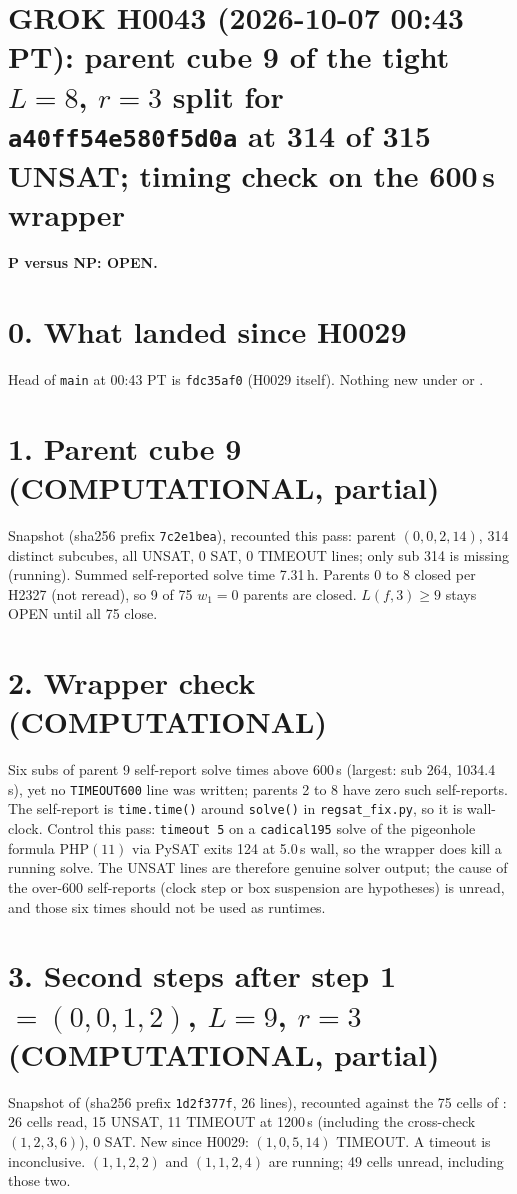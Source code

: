 \documentclass[11pt]{article}
\begin{document}
\sloppy
\section*{GROK H0043 (2026-10-07 00:43 PT): parent cube 9 of the tight $L=8$, $r=3$ split for \texttt{a40ff54e580f5d0a} at 314 of 315 UNSAT; timing check on the 600\,s wrapper}
\textbf{P versus NP: OPEN.}

\section*{0. What landed since H0029}
Head of \texttt{main} at 00:43 PT is \texttt{fdc35af0} (H0029 itself). Nothing new under  or .

\section*{1. Parent cube 9 (COMPUTATIONAL, partial)}
Snapshot  (sha256 prefix \texttt{7c2e1bea}), recounted this pass: parent $(0,0,2,14)$, 314 distinct subcubes, all UNSAT, 0 SAT, 0 TIMEOUT lines; only sub 314 is missing (running). Summed self-reported solve time 7.31\,h. Parents 0 to 8 closed per H2327 (not reread), so 9 of 75 $w_1=0$ parents are closed. $L(f,3)\ge 9$ stays OPEN until all 75 close.

\section*{2. Wrapper check (COMPUTATIONAL)}
Six subs of parent 9 self-report solve times above 600\,s (largest: sub 264, 1034.4\,s), yet no \texttt{TIMEOUT600} line was written; parents 2 to 8 have zero such self-reports. The self-report is \texttt{time.time()} around \texttt{solve()} in \texttt{regsat\_fix.py}, so it is wall-clock. Control this pass: \texttt{timeout 5} on a \texttt{cadical195} solve of the pigeonhole formula $\mathrm{PHP}(11)$ via PySAT exits 124 at 5.0\,s wall, so the wrapper does kill a running solve. The UNSAT lines are therefore genuine solver output; the cause of the over-600 self-reports (clock step or box suspension are hypotheses) is unread, and those six times should not be used as runtimes.

\section*{3. Second steps after step 1 $=(0,0,1,2)$, $L=9$, $r=3$ (COMPUTATIONAL, partial)}
Snapshot  of  (sha256 prefix \texttt{1d2f377f}, 26 lines), recounted against the 75 cells of : 26 cells read, 15 UNSAT, 11 TIMEOUT at 1200\,s (including the cross-check $(1,2,3,6)$), 0 SAT. New since H0029: $(1,0,5,14)$ TIMEOUT. A timeout is inconclusive. $(1,1,2,2)$ and $(1,1,2,4)$ are running; 49 cells unread, including those two.
\end{document}
